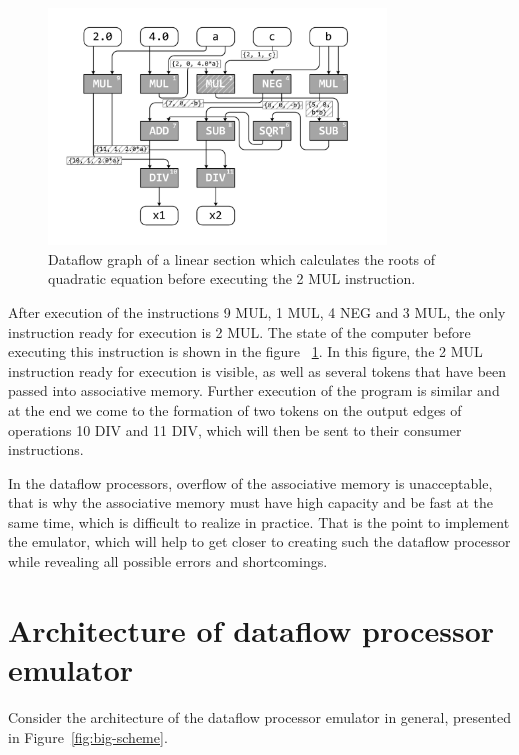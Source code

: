 \documentclass[
11pt,%
tightenlines,%
twoside,%
onecolumn,%
nofloats,%
nobibnotes,%
nofootinbib,%
superscriptaddress,%
noshowpacs,%
centertags]%
{revtex4}
\begin{document}
\begin{figure}[h]
\setcaptionmargin{5mm}
\onelinecaptionsfalse %
\includegraphics[width=0.80\textwidth]{pics/dataflow2.pdf}
\caption{Dataflow graph of a linear section which calculates the roots of quadratic equation before executing the 2 MUL instruction.}\label{fig:dataflow2}
\end{figure}

After execution of the instructions 9 MUL, 1 MUL, 4 NEG and 3 MUL, the only instruction ready for execution is 2 MUL.
The state of the computer before executing this instruction is shown in the figure ~\ref{fig:dataflow2}.
In this figure, the 2 MUL instruction ready for execution is visible, as well as several tokens that have been passed into associative memory.
Further execution of the program is similar and at the end we come to the formation of two tokens on the output edges of operations 10 DIV and 11 DIV, which will then be sent to their consumer instructions.

In the dataflow processors, overflow of the associative memory is unacceptable, that is why the associative memory must have high capacity and be fast at the same time, which is difficult to realize in practice.
That is the point to implement the emulator, which will help to get closer to creating such the dataflow processor while revealing all possible errors and shortcomings.

\section{Architecture of dataflow processor emulator}

Consider the architecture of the dataflow processor emulator in general, presented in Figure~\ref{fig:big-scheme}.
\end{document}
